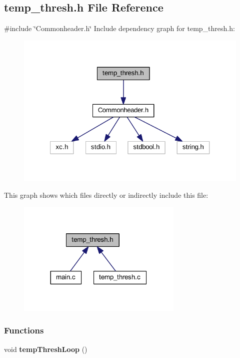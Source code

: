\subsection{temp\+\_\+thresh.\+h File Reference}
\label{a00056}
{\ttfamily \#include \char`\"{}Commonheader.\+h\char`\"{}}\newline
Include dependency graph for temp\+\_\+thresh.\+h\+:
\nopagebreak
\begin{figure}[H]
\begin{center}
\leavevmode
\includegraphics[width=321pt]{a00057}
\end{center}
\end{figure}
This graph shows which files directly or indirectly include this file\+:
\nopagebreak
\begin{figure}[H]
\begin{center}
\leavevmode
\includegraphics[width=224pt]{a00058}
\end{center}
\end{figure}
\subsubsection*{Functions}
\begin{DoxyCompactItemize}
\item 
void \textbf{ temp\+Thresh\+Loop} ()
\end{DoxyCompactItemize}
